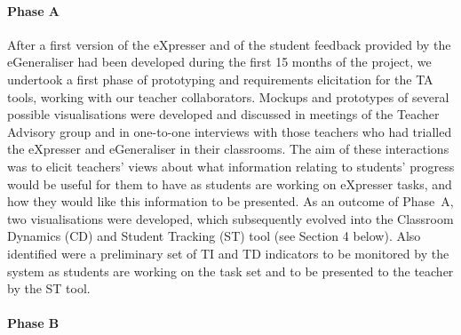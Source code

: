 \paragraph{Phase A}
\label{sec:phase}

After a first version of the eXpresser and of the student feedback
provided by the eGeneraliser had been developed during the first 15
months of the project, we undertook a first phase of prototyping and
requirements elicitation for the TA tools, working with our teacher
collaborators.    %
Mockups and
prototypes of several possible visualisations were developed and
discussed in meetings of the Teacher Advisory group and in one-to-one
interviews with those teachers who had trialled the eXpresser and
eGeneraliser in their classrooms. The aim of these interactions was to
elicit teachers' views about what information relating to students'
progress would be useful for them to have as
students are working on eXpresser tasks, and how they would like this
information to be presented.  
As an outcome of Phase~A, two visualisations were developed, 
which subsequently evolved into the Classroom Dynamics
(CD) and Student Tracking (ST) tool (see Section 4 below). 
Also identified were a preliminary set of TI and TD indicators
to be monitored by the system as students are working on the task
set and to be presented to the teacher by the ST tool.

\paragraph{Phase B}
\label{sec:phase-b}

